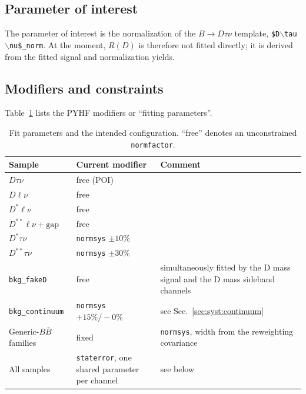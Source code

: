 \subsection{Parameter of interest}
\label{sec:fit:poi}

The parameter of interest is the normalization of
the $B \to D \tau \nu$ template, \texttt{\$D$\backslash$tau$\backslash$nu\$\_norm}.
At the moment, $R(D)$ is therefore not fitted directly; it is derived from the fitted
signal and normalization yields.


\subsection{Modifiers and constraints}
\label{sec:fit:modifiers}

Table~\ref{tab:fit-parameters} lists the PYHF modifiers or ``fitting parameters''.

\begin{table}[htbp]
  \centering
  \caption{Fit parameters and the
  intended configuration. ``free'' denotes an unconstrained
  \texttt{normfactor}.}
  \vspace{2mm}
  \label{tab:fit-parameters}
  \small
  \begin{tabular}{>{\raggedright\arraybackslash}p{} >{\raggedright\arraybackslash}p{} >{\raggedright\arraybackslash}p{}}
    \hline
    Sample & Current modifier & Comment \\
    \hline
    $D\tau\nu$ & free (POI) &  \\
    $D\ell\nu$ & free &  \\
    $D^{*}\ell\nu$ & free &  \\
    $D^{**}\ell\nu + \text{gap}$ & free &  \\
    $D^{*}\tau\nu$ & \texttt{normsys} $\pm 10\%$ &  \\
    $D^{**}\tau\nu$ & \texttt{normsys} $\pm 30\%$ &  \\
    \texttt{bkg\_fakeD} & free &  simultaneously fitted by the D mass signal and the D mass sideband channels \\
    \texttt{bkg\_continuum} & \texttt{normsys} $+15\%/-0\%$ & see Sec.~\ref{sec:syst:continuum} \\
    Generic-$B\bar{B}$ families & fixed & \texttt{normsys}, width from the reweighting covariance \\
    All samples & \texttt{staterror}, one shared parameter per channel & see below \\
    \hline
  \end{tabular}
\end{table}




